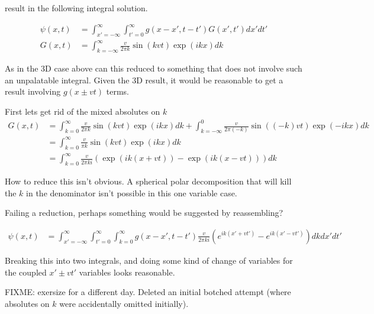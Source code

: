 \documentclass{article}
\begin{document}
result in the following integral solution.

\begin{align}\label{eqn:oneDimResult}
{\psi}(x, t)
&=
\int_{x'=-\infty}^\infty
\int_{t' = 0}^\infty {g}(x-x', t-t') G(x', t') dx' dt' \\
G(x, t) &=
\int_{k = -\infty}^\infty
\frac{v}{2\pi {k}}
\sin( {k} v t )
\exp( i k x )
dk
\end{align}

As in the 3D case above can this reduced to something that does not involve such an unpalatable integral.
Given the 3D result, it would be reasonable to get a result involving $g(x \pm vt)$ terms.

First lets get rid of the mixed absolutes on $k$
\begin{align*}
G(x, t)
&=
\int_{k = 0}^\infty
\frac{v}{2\pi {k}}
\sin( {k} v t )
\exp( i k x )
dk
+\int_{k = -\infty}^0
\frac{v}{2\pi (-k)}
\sin( (-k) v t )
\exp( -i k x )
dk \\
&=
\int_{k = 0}^\infty
\frac{v}{\pi {k}}
\sin( {k} v t )
\exp( i k x )
dk \\
&=
\int_{k = 0}^\infty
\frac{v}{2 \pi {k} i}
\left(
\exp( i k (x + vt)) - \exp( i k (x - vt))
\right)
dk
\end{align*}

How to reduce this isn't obvious.  A spherical polar decomposition that will kill the $k$ in the denominator isn't possible
in this one variable case.

Failing a reduction, perhaps something would be suggested by reassembling?

\begin{align}
{\psi}(x, t)
&=
\int_{x'=-\infty}^\infty
\int_{t'= 0}^\infty
\int_{k = 0}^\infty
{g}(x-x', t-t') 
\frac{v}{2 \pi {k} i}
\left(
e^{ i k (x' + vt')} - e^{ i k (x' - vt')}
\right)
dk
dx' dt' %
\end{align}

Breaking this into two integrals, and doing some kind of change of variables for the coupled $x' \pm vt'$ variables looks
reasonable.

FIXME: exersize for a different day.  Deleted an initial botched attempt (where absolutes on $k$ were accidentally omitted
initially).




\end{document}
